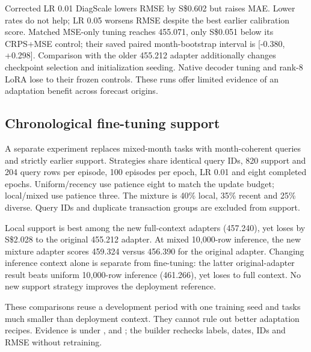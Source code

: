 \documentclass[conference]{IEEEtran}
\newcommand{\sgd}{S\$}
\begin{document}
Corrected LR 0.01 DiagScale lowers RMSE by \sgd0.602 but raises MAE. Lower rates do not help; LR 0.05 worsens RMSE despite the best earlier calibration score. Matched MSE-only tuning reaches 455.071, only \sgd0.051 below its CRPS+MSE control; their saved paired month-bootstrap interval is [\mbox{-0.380}, +0.298]. Comparison with the older 455.212 adapter additionally changes checkpoint selection and initialization seeding. Native decoder tuning and rank-8 LoRA lose to their frozen controls. These runs offer limited evidence of an adaptation benefit across forecast origins.

\subsection{Chronological fine-tuning support}
A separate experiment replaces mixed-month tasks with month-coherent queries and strictly earlier support. Strategies share identical query IDs, 820 support and 204 query rows per episode, 100 episodes per epoch, LR 0.01 and eight completed epochs. Uniform/recency use patience eight to match the update budget; local/mixed use patience three. The mixture is 40\% local, 35\% recent and 25\% diverse. Query IDs and duplicate transaction groups are excluded from support.

\begin{table}[!ht]
\caption{Month-coherent DiagScale training: RMSE (SGD) under two inference contexts. These four adapters have equal update budgets. The original adapter uses different query episodes and is a deployment reference rather than a support-only control.}
\label{tab:finetuningsupport}
\centering\small

\end{table}

Local support is best among the new full-context adapters (457.240), yet loses by \sgd2.028 to the original 455.212 adapter. At mixed 10,000-row inference, the new mixture adapter scores 459.324 versus 456.390 for the original adapter. Changing inference context alone is separate from fine-tuning: the latter original-adapter result beats uniform 10,000-row inference (461.266), yet loses to full context. No new support strategy improves the deployment reference.

These comparisons reuse a development period with one training seed and tasks much smaller than deployment context. They cannot rule out better adaptation recipes. Evidence is under ,  and ; the builder rechecks labels, dates, IDs and RMSE without retraining.
\par\endgroup
\end{document}
